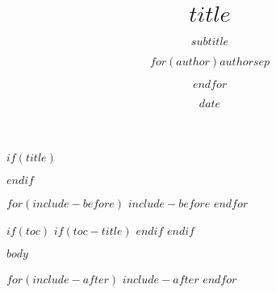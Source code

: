\documentclass[
  12pt,
  a4paper
]{scrartcl}
\title{$title$}
\subtitle{$subtitle$}
\author{$for(author)$$author$$sep$ \and $endfor$}
\date{$date$}
\theoremstyle{cthmstyle}
\theoremstyle{cclaimstyle}
\begin{document}
$if(title)$
\maketitle
$endif$

$for(include-before)$
$include-before$
$endfor$

$if(toc)$
$if(toc-title)$
\renewcommand*\contentsname{$toc-title$}
$endif$
\setcounter{tocdepth}{$toc-depth$}
\newpage
\tableofcontents
$endif$

\newpage

$body$

$for(include-after)$
$include-after$
$endfor$
\end{document}
